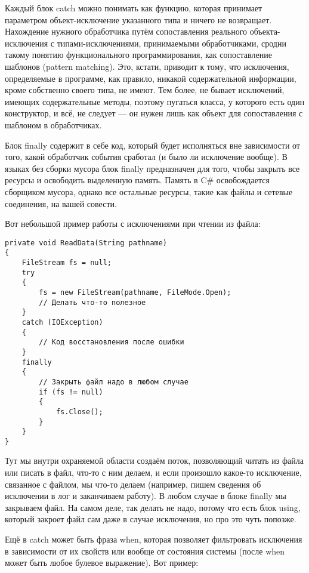 \documentclass[a5paper]{article}
\begin{document}
Каждый блок catch можно понимать как функцию, которая принимает параметром объект-исключение указанного типа и ничего не возвращает. Нахождение нужного обработчика путём сопоставления реального объекта-исключения с типами-исключениями, принимаемыми обработчиками, сродни такому понятию функционального программирования, как сопоставление шаблонов (pattern matching). Это, кстати, приводит к тому, что исключения, определяемые в программе, как правило, никакой содержательной информации, кроме собственно своего типа, не имеют. Тем более, не бывает исключений, имеющих содержательные методы, поэтому пугаться класса, у которого есть один конструктор, и всё, не следует --- он нужен лишь как объект для сопоставления с шаблоном в обработчиках.

Блок finally содержит в себе код, который будет исполняться вне зависимости от того, какой обработчик события сработал (и было ли исключение вообще). В языках без сборки мусора блок finally предназначен для того, чтобы закрыть все ресурсы и освободить выделенную память. Память в C\# освобождается сборщиком мусора, однако все остальные ресурсы, такие как файлы и сетевые соединения, на вашей совести. 

Вот небольшой пример работы с исключениями при чтении из файла:

\begin{verbatim}
private void ReadData(String pathname) 
{
    FileStream fs = null;
    try 
    {
        fs = new FileStream(pathname, FileMode.Open);
        // Делать что-то полезное
    }
    catch (IOException) 
    {
        // Код восстановления после ошибки
    }
    finally 
    {
        // Закрыть файл надо в любом случае
        if (fs != null) 
        {
            fs.Close();
        }
    }
}
\end{verbatim}

Тут мы внутри охраняемой области создаём поток, позволяющий читать из файла или писать в файл, что-то с ним делаем, и если произошло какое-то исключение, связанное с файлом, мы что-то делаем (например, пишем сведения об исключении в лог и заканчиваем работу). В любом случае в блоке finally мы закрываем файл. На самом деле, так делать не надо, потому что есть блок using, который закроет файл сам даже в случае исключения, но про это чуть попозже.

Ещё в catch может быть фраза when, которая позволяет фильтровать исключения в зависимости от их свойств или вообще от состояния системы (после when может быть любое булевое выражение). Вот пример:
\end{document}
